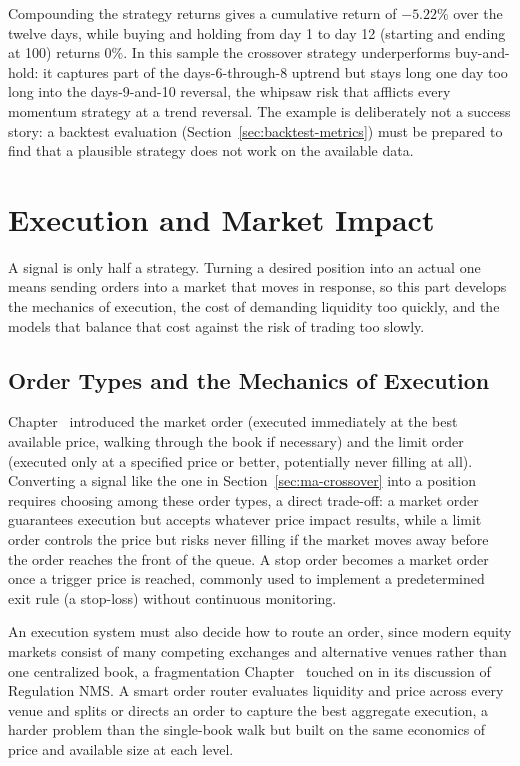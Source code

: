 \documentclass[../ai_in_finance]{subfiles}
\begin{document}
Compounding the strategy returns gives a cumulative return of $-5.22\%$ over the twelve days, while buying and holding from day 1 to day 12 (starting and ending at 100) returns $0\%$. In this sample the crossover strategy underperforms buy-and-hold: it captures part of the days-6-through-8 uptrend but stays long one day too long into the days-9-and-10 reversal, the whipsaw risk that afflicts every momentum strategy at a trend reversal. The example is deliberately not a success story: a backtest evaluation (Section~\ref{sec:backtest-metrics}) must be prepared to find that a plausible strategy does not work on the available data.

\section{Execution and Market Impact}

A signal is only half a strategy. Turning a desired position into an actual one means sending orders into a market that moves in response, so this part develops the mechanics of execution, the cost of demanding liquidity too quickly, and the models that balance that cost against the risk of trading too slowly.

\subsection{Order Types and the Mechanics of Execution}

Chapter~ introduced the market order (executed immediately at the best available price, walking through the book if necessary) and the limit order (executed only at a specified price or better, potentially never filling at all). Converting a signal like the one in Section~\ref{sec:ma-crossover} into a position requires choosing among these order types, a direct trade-off: a market order guarantees execution but accepts whatever price impact results, while a limit order controls the price but risks never filling if the market moves away before the order reaches the front of the queue. A stop order becomes a market order once a trigger price is reached, commonly used to implement a predetermined exit rule (a stop-loss) without continuous monitoring.

An execution system must also decide how to route an order, since modern equity markets consist of many competing exchanges and alternative venues rather than one centralized book, a fragmentation Chapter~ touched on in its discussion of Regulation NMS. A smart order router evaluates liquidity and price across every venue and splits or directs an order to capture the best aggregate execution, a harder problem than the single-book walk but built on the same economics of price and available size at each level.
\end{document}
